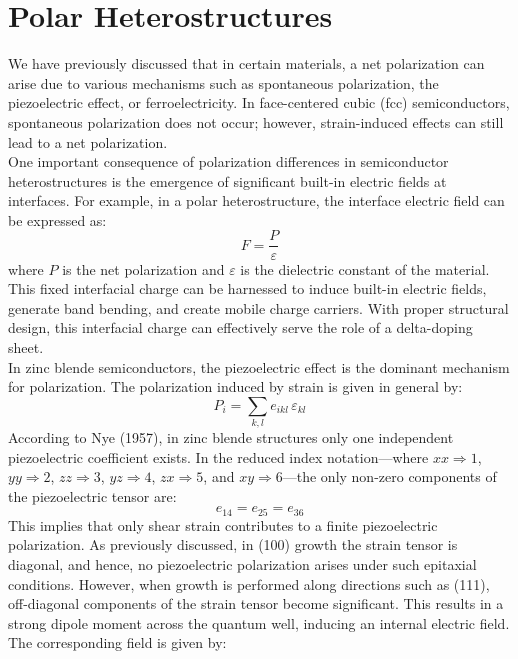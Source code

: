 \section{Polar Heterostructures}
We have previously discussed that in certain materials, a net polarization can arise due to various mechanisms such as spontaneous polarization, the piezoelectric effect, or ferroelectricity. In face-centered cubic (fcc) semiconductors, spontaneous polarization does not occur; however, strain-induced effects can still lead to a net polarization.\\
One important consequence of polarization differences in semiconductor heterostructures is the emergence of significant built-in electric fields at interfaces. For example, in a polar heterostructure, the interface electric field can be expressed as:
\begin{equation}
	F = \frac{P}{\varepsilon}
\end{equation}
where \( P \) is the net polarization and \( \varepsilon \) is the dielectric constant of the material. This fixed interfacial charge can be harnessed to induce built-in electric fields, generate band bending, and create mobile charge carriers. With proper structural design, this interfacial charge can effectively serve the role of a delta-doping sheet.\\
In zinc blende semiconductors, the piezoelectric effect is the dominant mechanism for polarization. The polarization induced by strain is given in general by:
\begin{equation}
	P_i = \sum_{k,l} e_{ikl} \, \varepsilon_{kl}
\end{equation}
According to Nye (1957), in zinc blende structures only one independent piezoelectric coefficient exists. In the reduced index notation—where \( xx \Rightarrow 1 \), \( yy \Rightarrow 2 \), \( zz \Rightarrow 3 \), \( yz \Rightarrow 4 \), \( zx \Rightarrow 5 \), and \( xy \Rightarrow 6 \)—the only non-zero components of the piezoelectric tensor are:
\begin{equation}
	e_{14} = e_{25} = e_{36}
\end{equation}
This implies that only shear strain contributes to a finite piezoelectric polarization. As previously discussed, in (100) growth the strain tensor is diagonal, and hence, no piezoelectric polarization arises under such epitaxial conditions. However, when growth is performed along directions such as (111), off-diagonal components of the strain tensor become significant. This results in a strong dipole moment across the quantum well, inducing an internal electric field. The corresponding field is given by:
